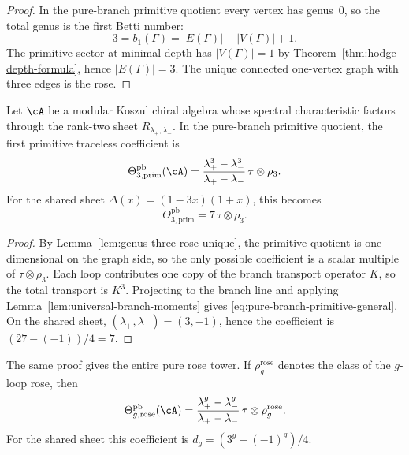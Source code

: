 \begin{proof}
In the pure-branch primitive quotient every vertex has genus~\(0\), so
the total genus is the first Betti number:
\[
3=b_1(\Gamma)=|E(\Gamma)|-|V(\Gamma)|+1.
\]
The primitive sector at minimal depth has \(|V(\Gamma)|=1\) by
Theorem~\ref{thm:hodge-depth-formula}, hence \(|E(\Gamma)|=3\). The
unique connected one-vertex graph with three edges is the rose.
\end{proof}

\begin{theorem}
\label{thm:pure-branch-primitive-coefficient}
Let \(\cA\) be a modular Koszul chiral algebra whose spectral
characteristic factors through the rank-two sheet
\(R_{\lambda_+,\lambda_-}\). In the pure-branch primitive quotient, the
first primitive traceless coefficient is
\begin{equation}
\label{eq:pure-branch-primitive-general}
\Theta^{\mathrm{pb}}_{3,\mathrm{prim}}(\cA)
=
\frac{\lambda_+^3-\lambda_-^3}{\lambda_+-\lambda_-}
\,\tau\otimes \rho_3.
\end{equation}
For the shared sheet
\(\Delta(x)=(1-3x)(1+x)\), this becomes
\begin{equation}
\label{eq:pure-branch-primitive-seven}
\Theta^{\mathrm{pb}}_{3,\mathrm{prim}}=7\,\tau\otimes \rho_3.
\end{equation}
\end{theorem}

\begin{proof}
By Lemma~\ref{lem:genus-three-rose-unique}, the primitive quotient is
one-dimensional on the graph side, so the only possible coefficient is a
scalar multiple of \(\tau\otimes \rho_3\). Each loop contributes one
copy of the branch transport operator \(K\), so the total transport is
\(K^3\). Projecting to the branch line and applying
Lemma~\ref{lem:universal-branch-moments} gives
\eqref{eq:pure-branch-primitive-general}. On the shared sheet,
\((\lambda_+,\lambda_-)=(3,-1)\), hence the coefficient is
\((27-(-1))/4=7\).
\end{proof}

\begin{remark}
\label{rem:rose-coefficients-all-genera}
The same proof gives the entire pure rose tower. If
\(\rho_g^{\mathrm{rose}}\) denotes the class of the \(g\)-loop rose, then
\begin{equation}
\label{eq:rose-coefficients-all-genera}
\Theta^{\mathrm{pb}}_{g,\mathrm{rose}}(\cA)
=
\frac{\lambda_+^g-\lambda_-^g}{\lambda_+-\lambda_-}
\,\tau\otimes \rho_g^{\mathrm{rose}}.
\end{equation}
For the shared sheet this coefficient is
\(d_g=(3^g-(-1)^g)/4\).
\end{remark}

